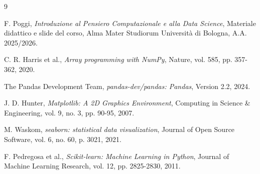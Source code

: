 \documentclass[11pt,a4paper]{article}
\begin{document}
\begin{thebibliography}{9}

    F. Poggi, 
    \emph{Introduzione al Pensiero Computazionale e alla Data Science}, 
    Materiale didattico e slide del corso, Alma Mater Studiorum Università di Bologna, A.A. 2025/2026.

    C. R. Harris et al., 
    \emph{Array programming with NumPy}, 
    Nature, vol. 585, pp. 357-362, 2020.

    The Pandas Development Team, 
    \emph{pandas-dev/pandas: Pandas}, 
    Version 2.2, 2024.

    J. D. Hunter, 
    \emph{Matplotlib: A 2D Graphics Environment}, 
    Computing in Science \& Engineering, vol. 9, no. 3, pp. 90-95, 2007.

    M. Waskom, 
    \emph{seaborn: statistical data visualization}, 
    Journal of Open Source Software, vol. 6, no. 60, p. 3021, 2021.

    F. Pedregosa et al., 
    \emph{Scikit-learn: Machine Learning in Python}, 
    Journal of Machine Learning Research, vol. 12, pp. 2825-2830, 2011.

\end{thebibliography}
\end{document}

